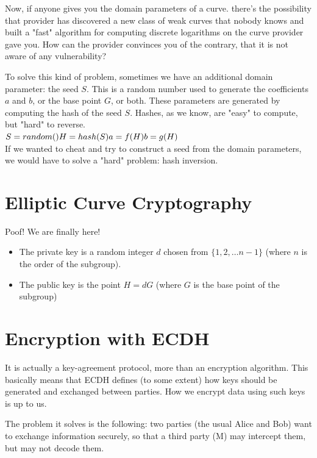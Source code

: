 \documentclass{article}
\begin{document}
Now, if anyone gives you the domain parameters of a curve. there's the possibility that provider has discovered a new class of weak curves that nobody knows and built a "fast" algorithm for computing discrete logarithms on the curve provider gave you. How can the provider convinces you of the contrary, that it is not aware of any vulnerability?

To solve this kind of problem, sometimes we have an additional domain parameter: the seed $S$. This is a random number used to generate the coefficients $a$ and $b$, or the base point $G$, or both. These parameters are generated by computing the hash of the seed $S$. Hashes, as we know, are "easy" to compute, but "hard" to reverse.\\
$S= random()\\
 H = hash(S)\\
 a = f(H)\\
 b = g(H)$\\
 If we wanted to cheat and try to construct a seed from the domain parameters, we would have to solve a "hard" problem: hash inversion.
 
 \section{Elliptic Curve Cryptography}
Poof! We are finally here!
\begin{itemize}
    \item The private key is a random integer $d$ chosen from $\{1,2,\dots n-1\}$  (where $n$ is the order of the subgroup).
    \item The public key is the point $H=dG$ (where $G$ is the base point of the subgroup)
\end{itemize}
\section{Encryption with ECDH}
It is actually a key-agreement protocol, more than an encryption algorithm. This basically means that ECDH defines (to some extent) how keys should be generated and exchanged between parties. How we encrypt data using such keys is up to us.

The problem it solves is the following: two parties (the usual Alice and Bob) want to exchange information securely, so that a third party (M) may intercept them, but may not decode them. 
\end{document}
